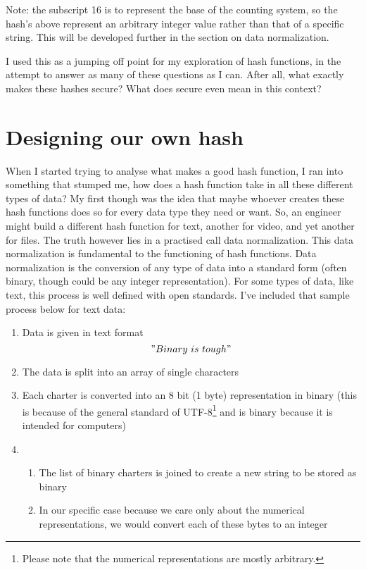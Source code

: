 \documentclass[11pt, oneside]{article}   	%
\begin{document}
Note: the subscript 16 is to represent the base of the counting system, so the hash’s above represent an arbitrary integer value rather than that of a specific string. This will be developed further in the section on data normalization.

I used this as a jumping off point for my exploration of hash functions, in the attempt to answer as many of these questions as I can. After all, what exactly makes these hashes secure? What does secure even mean in this context?

\section{Designing our own hash}

When I started trying to analyse what makes a good hash function, I ran into something that stumped me, how does a hash function take in all these different types of data? My first though was the idea that maybe whoever creates these hash functions does so for every data type they need or want. So, an engineer might build a different hash function for text, another for video, and yet another for files. The truth however lies in a practised call data normalization. This data normalization is fundamental to the functioning of hash functions. Data normalization is the conversion of any type of data into a standard form (often binary, though could be any integer representation). For some types of data, like text, this process is well defined with open standards. I’ve included that sample process below for text data:

\begin{enumerate}
    \item Data is given in text format
    \begin{equation}
 "Binary\ is\ tough"
\end{equation}

\item The data is split into an array of single characters
\item Each charter is converted into an 8 bit (1 byte) representation in binary (this is because of the general standard of UTF-8\footnote{ Please note that the numerical representations are mostly arbitrary.} and is binary because it is intended for computers)
\item 
\begin{enumerate}
    \item The list of binary charters is joined to create a new string to be stored as binary
    \item In our specific case because we care only about the numerical representations, we would convert each of these bytes to an integer
\end{enumerate}
\end{enumerate}
\end{document}

